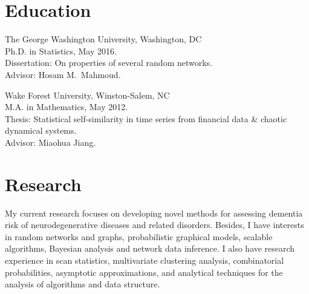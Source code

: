 \documentclass[margin]{res}
\begin{document}
\begin{resume} 
	
\section{Education} 
The George Washington University, Washington, DC \\
Ph.D. in Statistics, May 2016. \\
Dissertation: On properties of several random networks. \\
Advisor: Hosam M.\ Mahmoud.

Wake Forest University, Winston-Salem, NC \\
M.A. in Mathematics, May 2012. \\
Thesis: Statistical self-similarity in time series from financial data \& chaotic dynamical systems. \\
Advisor: Miaohua Jiang.
	
\section{Research}
My current research focuses on developing novel methods for assessing dementia risk of neurodegenerative diseases and related disorders. Besides, I have interests in random networks and graphs, probabilistic graphical models, scalable algorithms, Bayesian analysis and network data inference. I also have research experience in scan statistics, multivariate clustering analysis, combinatorial probabilities, asymptotic approximations, and analytical techniques for the analysis of algorithms and data structure. 	


\end{resume}
\end{document}
